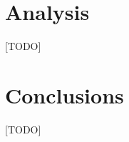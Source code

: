 \documentclass[12pt,a4paper,english,oneside]{article}
\begin{document}
\begin{multicols}{2}
\section{Analysis}

[TODO]

\section{Conclusions}

[TODO]







\end{multicols}
\end{document}
